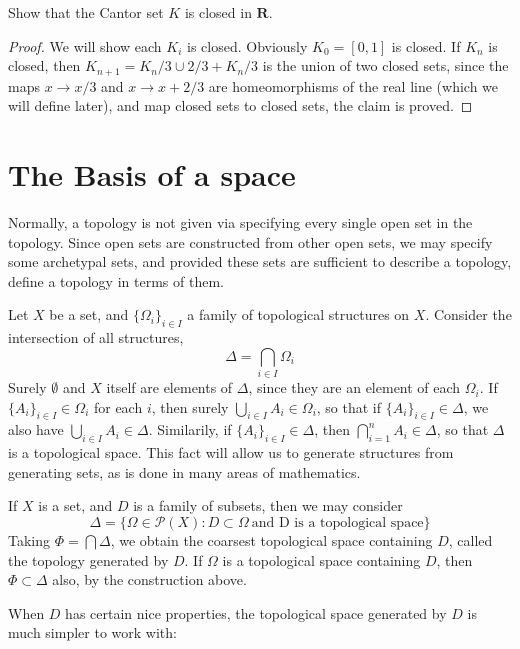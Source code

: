 \begin{exercise}
    Show that the Cantor set $K$ is closed in $\mathbf{R}$.
\end{exercise}
\begin{proof}
    We will show each $K_i$ is closed. Obviously $K_0 = [0,1]$ is closed. If $K_n$ is closed, then $K_{n+1} = K_n/3 \cup 2/3 + K_n/3$ is the union of two closed sets, since the maps $x \to x/3$ and $x \to x + 2/3$ are homeomorphisms of the real line (which we will define later), and map closed sets to closed sets, the claim is proved.
\end{proof}

\section{The Basis of a space}

Normally, a topology is not given via specifying every single open set in the topology. Since open sets are constructed from other open sets, we may specify some archetypal sets, and provided these sets are sufficient to describe a topology, define a topology in terms of them.

Let $X$ be a set, and $\{\Omega_i\}_{i \in I}$ a family of topological structures on $X$. Consider the intersection of all structures,
%
\[ \Delta = \bigcap_{i \in I} \Omega_i \]
%
Surely $\emptyset$ and $X$ itself are elements of $\Delta$, since they are an element of each $\Omega_i$. If $\{A_i\}_{i \in I} \in \Omega_i$ for each $i$, then surely $\bigcup_{i \in I} A_i \in \Omega_i$, so that if $\{A_i\}_{i \in I} \in \Delta$, we also have $\bigcup_{i \in I} A_i \in \Delta$. Similarily, if $\{A_i\}_{i \in I} \in \Delta$, then $\bigcap_{i = 1}^n A_i \in \Delta$, so that $\Delta$ is a topological space. This fact will allow us to generate structures from generating sets, as is done in many areas of mathematics.

If $X$ is a set, and $D$ is a family of subsets, then we may consider
%
\[ \Delta = \{ \Omega \in \mathcal{P}(X) : D \subset \Omega\ \text{and D is a topological space} \} \]
%
Taking $\Phi = \bigcap \Delta$, we obtain the coarsest topological space containing $D$, called the topology generated by $D$. If $\Omega$ is a topological space containing $D$, then $\Phi \subset \Delta$ also, by the construction above.

When $D$ has certain nice properties, the topological space generated by $D$ is much simpler to work with:

